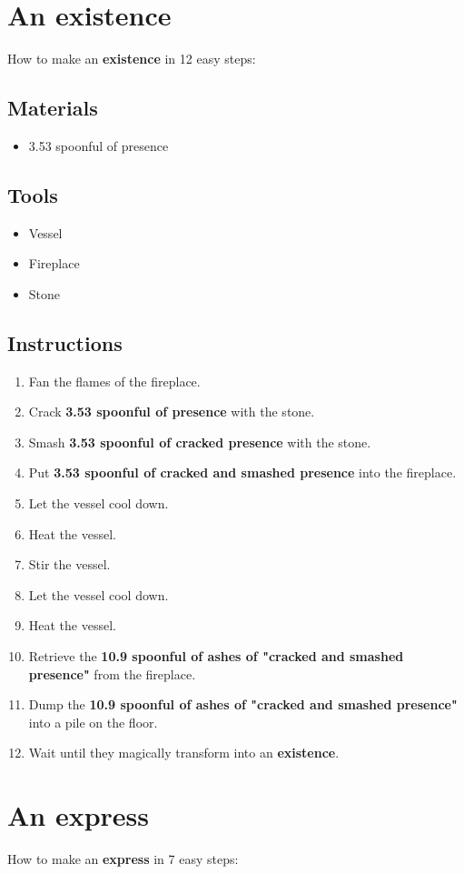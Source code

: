 \documentclass{article}
\begin{document}
\section{An existence}How to make an \textbf{existence} in 12 easy steps:

\subsection{Materials}\begin{itemize}
\item 
3.53 spoonful of presence
\end{itemize}
\subsection{Tools}\begin{itemize}
\item 
Vessel
\item 
Fireplace
\item 
Stone
\end{itemize}
\subsection{Instructions}\begin{enumerate}
\item 
Fan the flames of the fireplace.
\item 
Crack \textbf{3.53 spoonful of presence} with the stone.
\item 
Smash \textbf{3.53 spoonful of cracked presence} with the stone.
\item 
Put \textbf{3.53 spoonful of cracked and smashed presence} into the fireplace.
\item 
Let the vessel cool down.
\item 
Heat the vessel.
\item 
Stir the vessel.
\item 
Let the vessel cool down.
\item 
Heat the vessel.
\item 
Retrieve the \textbf{10.9 spoonful of ashes of "cracked and smashed presence"} from the fireplace.
\item 
Dump the \textbf{10.9 spoonful of ashes of "cracked and smashed presence"} into a pile on the floor.
\item 
Wait until they magically transform into an \textbf{existence}.
\end{enumerate}
\newpage
\section{An express}How to make an \textbf{express} in 7 easy steps:
\end{document}
